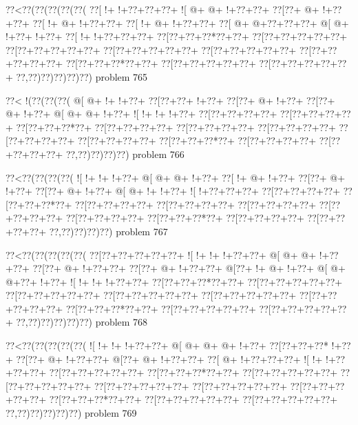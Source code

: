 \vbox{\vbox{\goo
\0??<\0??(\0??(\0??(\0??(\0??(
\0??[\- !+\- !+\0??+\0??+\0??+
\- ![\- @+\- @+\- !+\0??+\0??+
\0??[\0??+\- @+\- !+\0??+\0??+
\0??[\- !+\- @+\- !+\0??+\0??+
\0??[\- !+\- @+\- !+\0??+\0??+
\0??[\- @+\- @+\0??+\0??+\0??+
\- @[\- @+\- !+\0??+\- !+\0??+
\0??[\- !+\- !+\0??+\0??+\0??+
\0??[\0??+\0??+\0??*\0??+\0??+
\0??[\0??+\0??+\0??+\0??+\0??+
\0??[\0??+\0??+\0??+\0??+\0??+
\0??[\0??+\0??+\0??+\0??+\0??+
\0??[\0??+\0??+\0??+\0??+\0??+
\0??[\0??+\0??+\0??+\0??+\0??+
\0??[\0??+\0??+\0??*\0??+\0??+
\0??[\0??+\0??+\0??+\0??+\0??+
\0??[\0??+\0??+\0??+\0??+\0??+
\0??,\0??)\0??)\0??)\0??)\0??)
}
\hfil problem 765\hfil\break
}

\vbox{\vbox{\goo
\0??<\- !(\0??(\0??(\0??(
\- @[\- @+\- !+\- !+\0??+
\0??[\0??+\0??+\- !+\0??+
\0??[\0??+\- @+\- !+\0??+
\0??[\0??+\- @+\- !+\0??+
\- @[\- @+\- @+\- !+\0??+
\- ![\- !+\- !+\- !+\0??+
\0??[\0??+\0??+\0??+\0??+
\0??[\0??+\0??+\0??+\0??+
\0??[\0??+\0??+\0??*\0??+
\0??[\0??+\0??+\0??+\0??+
\0??[\0??+\0??+\0??+\0??+
\0??[\0??+\0??+\0??+\0??+
\0??[\0??+\0??+\0??+\0??+
\0??[\0??+\0??+\0??+\0??+
\0??[\0??+\0??+\0??*\0??+
\0??[\0??+\0??+\0??+\0??+
\0??[\0??+\0??+\0??+\0??+
\0??,\0??)\0??)\0??)\0??)
}
\hfil problem 766\hfil\break
}

\vbox{\vbox{\goo
\0??<\0??(\0??(\0??(\0??(
\- ![\- !+\- !+\- !+\0??+
\- @[\- @+\- @+\- !+\0??+
\0??[\- !+\- @+\- !+\0??+
\0??[\0??+\- @+\- !+\0??+
\0??[\0??+\- @+\- !+\0??+
\- @[\- @+\- !+\- !+\0??+
\- ![\- !+\0??+\0??+\0??+
\0??[\0??+\0??+\0??+\0??+
\0??[\0??+\0??+\0??*\0??+
\0??[\0??+\0??+\0??+\0??+
\0??[\0??+\0??+\0??+\0??+
\0??[\0??+\0??+\0??+\0??+
\0??[\0??+\0??+\0??+\0??+
\0??[\0??+\0??+\0??+\0??+
\0??[\0??+\0??+\0??*\0??+
\0??[\0??+\0??+\0??+\0??+
\0??[\0??+\0??+\0??+\0??+
\0??,\0??)\0??)\0??)\0??)
}
\hfil problem 767\hfil\break
}

\vbox{\vbox{\goo
\0??<\0??(\0??(\0??(\0??(\0??(
\0??[\0??+\0??+\0??+\0??+\0??+
\- ![\- !+\- !+\- !+\0??+\0??+
\- @[\- @+\- @+\- !+\0??+\0??+
\0??[\0??+\- @+\- !+\0??+\0??+
\0??[\0??+\- @+\- !+\0??+\0??+
\- @[\0??+\- !+\- @+\- !+\0??+
\- @[\- @+\- @+\0??+\- !+\0??+
\- ![\- !+\- !+\- !+\0??+\0??+
\0??[\0??+\0??+\0??*\0??+\0??+
\0??[\0??+\0??+\0??+\0??+\0??+
\0??[\0??+\0??+\0??+\0??+\0??+
\0??[\0??+\0??+\0??+\0??+\0??+
\0??[\0??+\0??+\0??+\0??+\0??+
\0??[\0??+\0??+\0??+\0??+\0??+
\0??[\0??+\0??+\0??*\0??+\0??+
\0??[\0??+\0??+\0??+\0??+\0??+
\0??[\0??+\0??+\0??+\0??+\0??+
\0??,\0??)\0??)\0??)\0??)\0??)
}
\hfil problem 768\hfil\break
}

\vbox{\vbox{\goo
\0??<\0??(\0??(\0??(\0??(\0??(
\- ![\- !+\- !+\- !+\0??+\0??+
\- @[\- @+\- @+\- @+\- !+\0??+
\0??[\0??+\0??+\0??*\- !+\0??+
\0??[\0??+\- @+\- !+\0??+\0??+
\- @[\0??+\- @+\- !+\0??+\0??+
\0??[\- @+\- !+\0??+\0??+\0??+
\- ![\- !+\- !+\0??+\0??+\0??+
\0??[\0??+\0??+\0??+\0??+\0??+
\0??[\0??+\0??+\0??*\0??+\0??+
\0??[\0??+\0??+\0??+\0??+\0??+
\0??[\0??+\0??+\0??+\0??+\0??+
\0??[\0??+\0??+\0??+\0??+\0??+
\0??[\0??+\0??+\0??+\0??+\0??+
\0??[\0??+\0??+\0??+\0??+\0??+
\0??[\0??+\0??+\0??*\0??+\0??+
\0??[\0??+\0??+\0??+\0??+\0??+
\0??[\0??+\0??+\0??+\0??+\0??+
\0??,\0??)\0??)\0??)\0??)\0??)
}
\hfil problem 769\hfil\break
}

